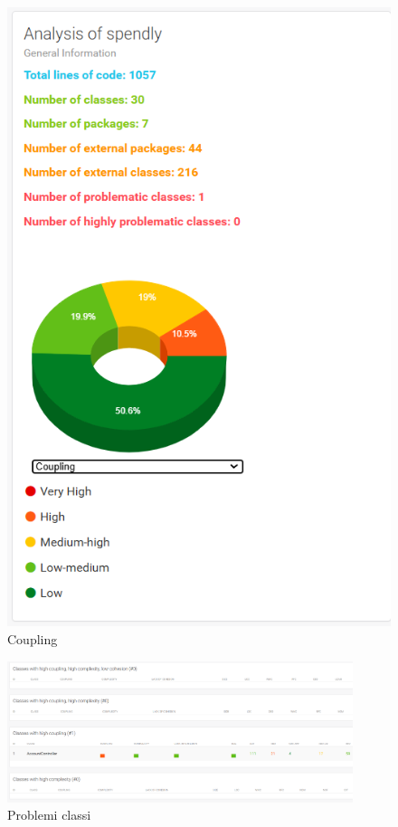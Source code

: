 \begin{figure}[H]
\begin{minipage}{0.45\textwidth}
    \end{minipage}
    \hfill
    \begin{minipage}{0.45\textwidth}
        \centering
        \includegraphics[width=\textwidth]{images/Coupling_iter2.png}
        \caption{Coupling}
        \label{fig:Coupling_iterazione2}
    \end{minipage}
\end{figure}

\begin{figure}[H]
    \centering
    \includegraphics[width=0.9\textwidth]{images/Problem_iter2.png}
    \caption{Problemi classi}
    \label{fig:Problemi_iterazione2}
\end{figure}



